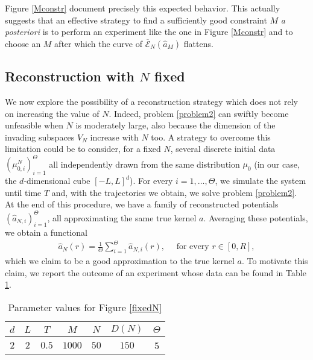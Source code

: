 Figure \ref{Mconstr} document precisely this expected behavior. This actually suggests that an effective strategy to find a sufficiently good constraint $M$ \textit{a posteriori} is to perform an experiment like the one in Figure \ref{Mconstr} and to choose an $M$ after which the curve of $\overline{\mathcal{E}}_N(\widehat{a}_M)$ flattens.

\subsection{Reconstruction with $N$ fixed}

We now explore the possibility of a reconstruction strategy which does not rely on increasing the value of $N$. Indeed, problem \eqref{problem2} can swiftly become unfeasible when $N$ is moderately large, also because the dimension of the invading subspaces $V_N$ increase with $N$ too. A strategy to overcome this limitation could be to consider, for a fixed $N$, several discrete initial data $(\mu^N_{0,i})_{i = 1}^{\Theta}$ all independently drawn from the same distribution $\mu_0$ (in our case, the $d$-dimensional cube $[-L,L]^d$). For every $i = 1,\ldots,\Theta$, we simulate the system until time $T$ and, with the trajectories we obtain, we solve problem \eqref{problem2}. At the end of this procedure, we have a family of reconstructed potentials $(\widehat{a}_{N,i})_{i = 1}^{\Theta}$, all approximating the same true kernel $a$. Averaging these potentials, we obtain a functional
\begin{align*}
\widehat{a}_N(r) = \frac{1}{\Theta} \sum^{\Theta}_{i = 1}\widehat{a}_{N,i}(r), \quad \text{ for every } r \in [0,R],
\end{align*}
which we claim to be a good approximation to the true kernel $a$. To motivate this claim, we report the outcome of an experiment whose data can be found in Table \ref{tab:fig5}.

\begin{table}[h]
\begin{center}
\begin{tabular}{ |c|c|c|c|c|c|c| }
\hline
  $d$ & $L$ & $T$ & $M$ & $N$ & $D(N)$ & $\Theta$ \\
\hline
\hline
  $2$ & $2$ & $0.5$ & $1000$ & $50$ & $150$ & 5  \\
\hline
\end{tabular}
\end{center}
\vspace{-0.5cm}
\caption{Parameter values for Figure \ref{fixedN}} \label{tab:fig5} 
\end{table}


